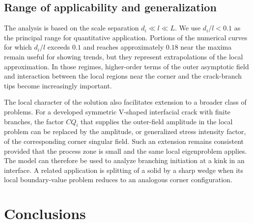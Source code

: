 \documentclass[pdflatex,iicol,sn-mathphys-ay]{sn-jnl}
\begin{document}
\subsection{Range of applicability and generalization}
\label{subsec:discussion-scope}

The analysis is based on the scale separation $d_i\ll l\ll L$. We use
$d_i/l<0.1$ as the principal range for quantitative application. Portions
of the numerical curves for which $d_i/l$ exceeds $0.1$ and reaches
approximately $0.18$ near the maxima remain useful for showing trends, but
they represent extrapolations of the local approximation. In those
regimes, higher-order terms of the outer asymptotic field and interaction
between the local regions near the corner and the crack-branch tips become
increasingly important.

The local character of the solution also facilitates extension to a
broader class of problems. For a developed symmetric V-shaped interfacial
crack with finite branches, the factor $CQ_i$ that supplies the outer-field
amplitude in the local problem can be replaced by the amplitude, or
generalized stress intensity factor, of the corresponding corner singular
field. Such an extension remains consistent provided that the process zone
is small and the same local eigenproblem applies. The model can therefore
be used to analyze branching initiation at a kink in an interface. A
related application is splitting of a solid by a sharp wedge when its
local boundary-value problem reduces to an analogous corner configuration.


\section{Conclusions}
\label{sec:conclusions}
\end{document}
